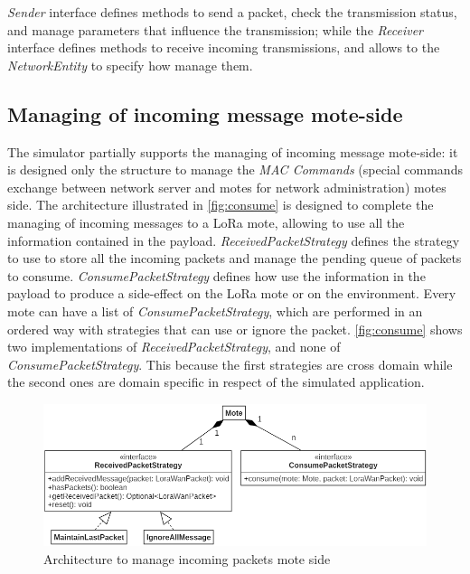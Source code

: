 \noindent \mbox{\textit{Sender}} interface defines methods to send a packet, check the transmission status, and manage parameters that influence the transmission; while the \mbox{\textit{Receiver}} interface defines methods to receive incoming transmissions, and allows to the \mbox{\textit{NetworkEntity}} to specify how manage them.

\subsection*{Managing of incoming message mote-side}

The simulator partially supports the managing of incoming message mote-side: it is designed only the structure to manage the \textit{MAC Commands} (special commands exchange between network server and motes for network administration) motes side.
The architecture illustrated in \autoref{fig:consume} is designed to complete the managing of incoming messages to a LoRa mote, allowing to use all the information contained in the payload.
\mbox{\textit{ReceivedPacketStrategy}} defines the strategy to use to store all the incoming packets and manage the pending queue of packets to consume.
\mbox{\textit{ConsumePacketStrategy}} defines how use the information in the payload to produce a side-effect on the LoRa mote or on the environment. 
Every mote can have a list of \mbox{\textit{ConsumePacketStrategy}}, which are performed in an ordered way with strategies that can use or ignore the packet.
\autoref{fig:consume} shows two implementations of \mbox{\textit{ReceivedPacketStrategy}}, and none of \mbox{\textit{ConsumePacketStrategy}}. This because the first strategies are cross domain while the second ones are domain specific in respect of the simulated application.
% 
\begin{figure}[H]
    \centering
    \includegraphics[width=\textwidth]{figures/consumePacket.png}
    \caption{Architecture to manage incoming packets mote side}
    \label{fig:consume}
\end{figure}
% 

